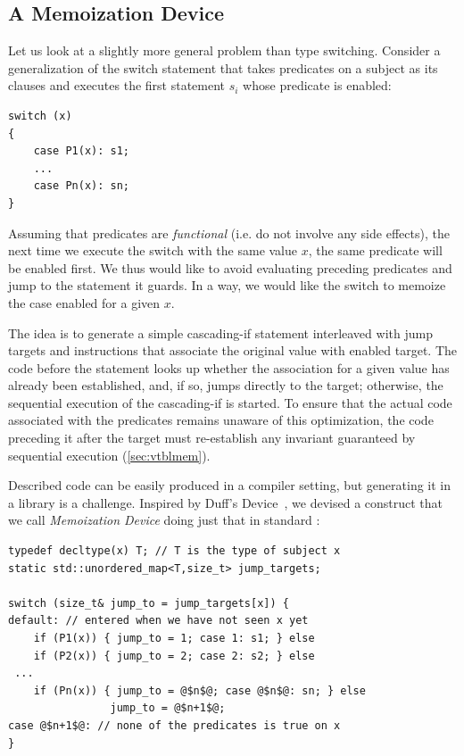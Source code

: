 \subsection{A Memoization Device}
\label{sec:memdev}

Let us look at a slightly more general problem than type switching. Consider a 
generalization of the switch statement that takes predicates on a subject as its 
clauses and executes the first statement $s_i$ whose predicate is enabled: 

\begin{lstlisting}[keepspaces]
switch (x)
{
    case P1(x): s1;
    ...
    case Pn(x): sn;
}
\end{lstlisting}

\noindent
Assuming that predicates are \emph{functional} (i.e. do not involve any side 
effects), the next time we execute the switch with the same value $x$, the same 
predicate will be enabled first. We thus would like to avoid evaluating 
preceding predicates and jump to the statement it guards. In a way, we 
would like the switch to memoize the case enabled for a given $x$. 

The idea is to generate a simple cascading-if statement interleaved with jump 
targets and instructions that associate the original value with enabled target. 
The code before the statement looks up whether the association for a given value 
has already been established, and, if so, jumps directly to the target; otherwise, 
the sequential execution of the cascading-if is started. To ensure 
that the actual code associated with the predicates remains unaware of this 
optimization, the code preceding it after the target must re-establish any 
invariant guaranteed by sequential execution (\textsection\ref{sec:vtblmem}).

Described code can be easily produced in a compiler setting, but generating it in 
a library is a challenge. Inspired by Duff's Device~\cite{Duff}, 
we devised a construct that we call \emph{Memoization Device} doing just 
that in standard \Cpp{}:

\begin{lstlisting}
typedef decltype(x) T; // T is the type of subject x
static std::unordered_map<T,size_t> jump_targets;

switch (size_t& jump_to = jump_targets[x]) {
default: // entered when we have not seen x yet
    if (P1(x)) { jump_to = 1; case 1: s1; } else 
    if (P2(x)) { jump_to = 2; case 2: s2; } else
 ...
    if (Pn(x)) { jump_to = @$n$@; case @$n$@: sn; } else
                jump_to = @$n+1$@;
case @$n+1$@: // none of the predicates is true on x
}
\end{lstlisting}

